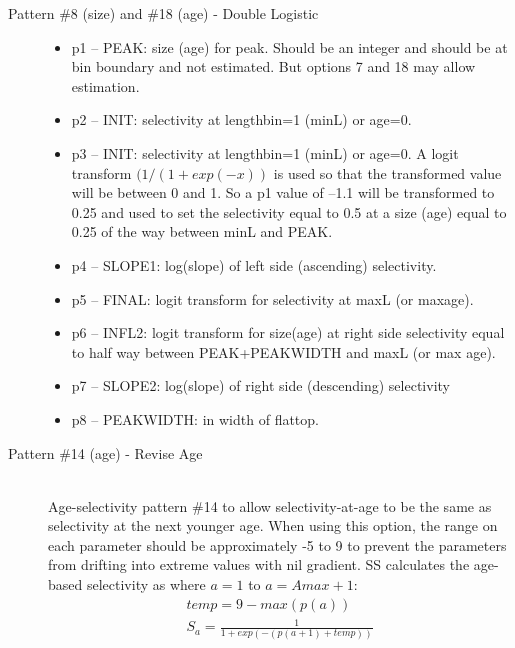 \begin{description}
	\item[Pattern \#8 (size) and \#18 (age) - Double Logistic]\hfil
	\begin{itemize}
		\item  p1 – PEAK:  size (age) for peak. Should be an integer and should be at bin boundary and not estimated.  But options 7 and 18 may allow estimation.
		\item p2 – INIT:  selectivity at lengthbin=1 (minL) or age=0.
		\item p3 – INIT:  selectivity at lengthbin=1 (minL) or age=0. A logit transform $(1/(1+exp(-x))$ is used so that the transformed value will be between 0 and 1.  So a p1 value of –1.1 will be transformed to 0.25 and used to set the selectivity equal to 0.5 at a size (age) equal to 0.25 of the way between minL and PEAK. 
		\item p4 – SLOPE1:  log(slope) of left side (ascending) selectivity.
		\item p5 – FINAL:  logit transform for selectivity at maxL (or maxage).
		\item p6 – INFL2:  logit transform for size(age) at right side selectivity equal to half way between PEAK+PEAKWIDTH and maxL (or max age).
		\item p7 – SLOPE2:  log(slope) of right side (descending) selectivity
		\item p8 – PEAKWIDTH:  in width of flattop.
	\end{itemize}
\end{description}

\begin{description}
	\item[Pattern \#14 (age) - Revise Age]\hfil\\
	Age-selectivity pattern \#14 to allow selectivity-at-age to be the same as selectivity at the next younger age.  When using this option, the range on each parameter should be approximately -5 to 9 to prevent the parameters from drifting into extreme values with nil gradient. SS calculates the age-based selectivity as where $a = 1$ to $a = Amax + 1$:
	\begin{equation}
		 \begin{split}
		 temp = 9 - max(p(a))\\
		S_a = \frac{1}{1+exp(-(p(a+1) + temp))}
		\end{split}
	\end{equation}	
\end{description}


